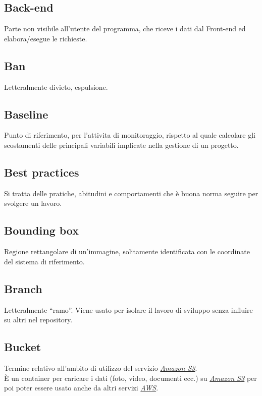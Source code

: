 \documentclass{classes/base}
\begin{document}
    	  \subsection*{Back-end}
    	  Parte non visibile all'utente del programma, che riceve i dati dal Front-end ed elabora/esegue le richieste.

        \subsection*{Ban}
        Letteralmente divieto, espulsione.
        
    	  \subsection*{Baseline}
    	  Punto di riferimento, per l'attivita di monitoraggio, rispetto al quale calcolare gli scostamenti delle principali variabili implicate nella gestione di un progetto.
        
        \subsection*{Best practices} 
        Si tratta delle pratiche, abitudini e comportamenti che è buona norma seguire per svolgere un lavoro.

        \subsection*{Bounding box}
        Regione rettangolare di un'immagine, solitamente identificata con le coordinate del sistema di riferimento.

        \subsection*{Branch} 
        Letteralmente “ramo”. Viene usato per isolare il lavoro di sviluppo senza influire su altri nel repository. 
        
        \subsection*{Bucket}
        Termine relativo all'ambito di utilizzo del servizio \hyperref[sec:S3]{\emph{Amazon S3}}.\\
        È un container per caricare i dati (foto, video, documenti ecc.) su \hyperref[sec:S3]{\emph{Amazon S3}} per poi poter essere usato anche da altri servizi \hyperref[sec:AWS]{\emph{AWS}}. 
        
\end{document}
